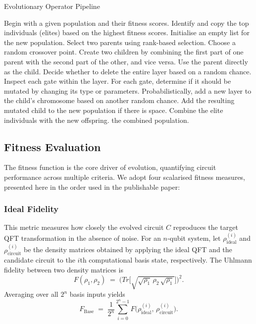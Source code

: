 \documentclass[11pt,a4paper]{article}
\begin{document}
\begin{algorithm}[H]
\caption{Evolutionary Operator Pipeline}
\begin{algorithmic}[1]
\State Begin with a given population and their fitness scores.
\State Identify and copy the top individuals (elites) based on the highest fitness scores.
\State Initialise an empty list for the new population.
    \State Select two parents using rank-based selection.
        \State Choose a random crossover point.
        \State Create two children by combining the first part of one parent with the second part of the other, and vice versa.
    \Else
        \State Use the parent directly as the child.
    \EndIf
            \State Decide whether to delete the entire layer based on a random chance.
                \State Inspect each gate within the layer.
                \State For each gate, determine if it should be mutated by changing its type or parameters.
            \EndIf
        \EndFor
        \State Probabilistically, add a new layer to the child's chromosome based on another random chance.
        \State Add the resulting mutated child to the new population if there is space.
    \EndFor
\EndWhile
\State Combine the elite individuals with the new offspring.
\State \Return the combined population.
\end{algorithmic}
\end{algorithm}

\subsection{Fitness Evaluation}
The fitness function is the core driver of evolution, quantifying circuit performance across multiple criteria.  We adopt four scalarised fitness measures, presented here in the order used in the publishable paper:

\subsubsection*{Ideal Fidelity}

This metric measures how closely the evolved circuit $C$ reproduces the target QFT transformation in the absence of noise.  For an $n$‐qubit system, let $\rho_{\mathrm{ideal}}^{(i)}$ and $\rho_{\mathrm{circuit}}^{(i)}$ be the density matrices obtained by applying the ideal QFT and the candidate circuit to the $i$th computational basis state, respectively.  The Uhlmann fidelity between two density matrices is
\[
F(\rho_1,\rho_2)\;=\;\bigl(Tr\bigl[\sqrt{\sqrt{\rho_1}\,\rho_2\,\sqrt{\rho_1}}\bigr]\bigr)^2.
\]
Averaging over all $2^n$ basis inputs yields
\begin{equation}
  F_{\mathrm{Base}}
  \;=\;\frac{1}{2^n}\sum_{i=0}^{2^n-1}
    F\bigl(\rho_{\mathrm{ideal}}^{(i)},\,\rho_{\mathrm{circuit}}^{(i)}\bigr).
\end{equation}
\end{document}

